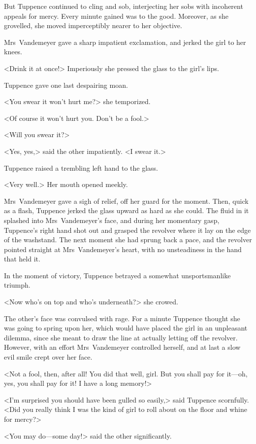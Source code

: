 But Tuppence continued to cling and sob, interjecting her sobs with incoherent appeals for mercy. Every minute gained was to the good. Moreover, as she grovelled, she moved imperceptibly nearer to her objective.

Mrs~Vandemeyer gave a sharp impatient exclamation, and jerked the girl to her knees.

<Drink it at once!> Imperiously she pressed the glass to the girl's lips.

Tuppence gave one last despairing moan.

<You swear it won't hurt me?> she temporized.

<Of course it won't hurt you. Don't be a fool.>

<Will you swear it?>

<Yes, yes,> said the other impatiently. <I swear it.>

Tuppence raised a trembling left hand to the glass.

<Very well.> Her mouth opened meekly.

Mrs~Vandemeyer gave a sigh of relief, off her guard for the moment. Then, quick as a flash, Tuppence jerked the glass upward as hard as she could. The fluid in it splashed into Mrs~Vandemeyer's face, and during her momentary gasp, Tuppence's right hand shot out and grasped the revolver where it lay on the edge of the washstand. The next moment she had sprung back a pace, and the revolver pointed straight at Mrs~Vandemeyer's heart, with no unsteadiness in the hand that held it.

In the moment of victory, Tuppence betrayed a somewhat unsportsmanlike triumph.

<Now who's on top and who's underneath?> she crowed.

The other's face was convulsed with rage. For a minute Tuppence thought she was going to spring upon her, which would have placed the girl in an unpleasant dilemma, since she meant to draw the line at actually letting off the revolver. However, with an effort Mrs~Vandemeyer controlled herself, and at last a slow evil smile crept over her face.

<Not a fool, then, after all! You did that well, girl. But you shall pay for it—oh, yes, you shall pay for it! I have a long memory!>

<I'm surprised you should have been gulled so easily,> said Tuppence scornfully. <Did you really think I was the kind of girl to roll about on the floor and whine for mercy?>

<You may do—some day!> said the other significantly.

